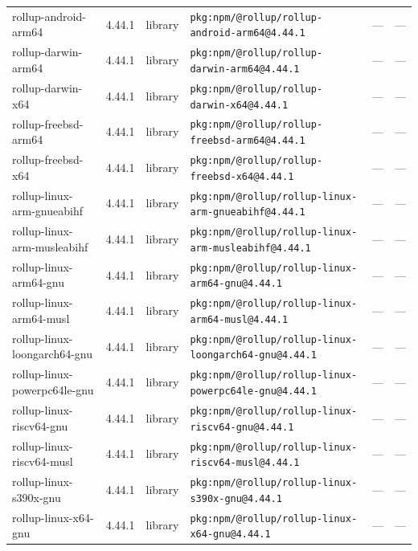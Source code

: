 \documentclass[11pt,a4paper]{article}
\begin{document}
\begin{longtable}{|p{4cm}|p{2cm}|p{1.6cm}|p{5cm}|p{1.5cm}|p{3.5cm}|}
\raggedright rollup-android-arm64 & 4.44.1 & library & \small\texttt{pkg:npm/@rollup/rollup-android-arm64@4.44.1} & — & \small — \\
\raggedright rollup-darwin-arm64 & 4.44.1 & library & \small\texttt{pkg:npm/@rollup/rollup-darwin-arm64@4.44.1} & — & \small — \\
\raggedright rollup-darwin-x64 & 4.44.1 & library & \small\texttt{pkg:npm/@rollup/rollup-darwin-x64@4.44.1} & — & \small — \\
\raggedright rollup-freebsd-arm64 & 4.44.1 & library & \small\texttt{pkg:npm/@rollup/rollup-freebsd-arm64@4.44.1} & — & \small — \\
\raggedright rollup-freebsd-x64 & 4.44.1 & library & \small\texttt{pkg:npm/@rollup/rollup-freebsd-x64@4.44.1} & — & \small — \\
\raggedright rollup-linux-arm-gnueabihf & 4.44.1 & library & \small\texttt{pkg:npm/@rollup/rollup-linux-arm-gnueabihf@4.44.1} & — & \small — \\
\raggedright rollup-linux-arm-musleabihf & 4.44.1 & library & \small\texttt{pkg:npm/@rollup/rollup-linux-arm-musleabihf@4.44.1} & — & \small — \\
\raggedright rollup-linux-arm64-gnu & 4.44.1 & library & \small\texttt{pkg:npm/@rollup/rollup-linux-arm64-gnu@4.44.1} & — & \small — \\
\raggedright rollup-linux-arm64-musl & 4.44.1 & library & \small\texttt{pkg:npm/@rollup/rollup-linux-arm64-musl@4.44.1} & — & \small — \\
\raggedright rollup-linux-loongarch64-gnu & 4.44.1 & library & \small\texttt{pkg:npm/@rollup/rollup-linux-loongarch64-gnu@4.44.1} & — & \small — \\
\raggedright rollup-linux-powerpc64le-gnu & 4.44.1 & library & \small\texttt{pkg:npm/@rollup/rollup-linux-powerpc64le-gnu@4.44.1} & — & \small — \\
\raggedright rollup-linux-riscv64-gnu & 4.44.1 & library & \small\texttt{pkg:npm/@rollup/rollup-linux-riscv64-gnu@4.44.1} & — & \small — \\
\raggedright rollup-linux-riscv64-musl & 4.44.1 & library & \small\texttt{pkg:npm/@rollup/rollup-linux-riscv64-musl@4.44.1} & — & \small — \\
\raggedright rollup-linux-s390x-gnu & 4.44.1 & library & \small\texttt{pkg:npm/@rollup/rollup-linux-s390x-gnu@4.44.1} & — & \small — \\
\raggedright rollup-linux-x64-gnu & 4.44.1 & library & \small\texttt{pkg:npm/@rollup/rollup-linux-x64-gnu@4.44.1} & — & \small — \\

\end{longtable}
\end{document}

